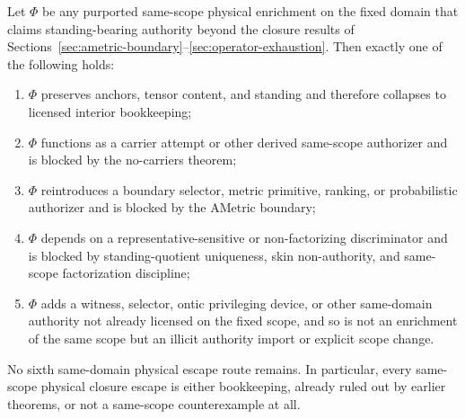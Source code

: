 \begin{theorem}
\label{thm:physical-closure-escape-exhaustion}
Let $\Phi$ be any purported same-scope physical enrichment on the fixed domain that claims standing-bearing authority beyond the closure results of Sections~\ref{sec:ametric-boundary}--\ref{sec:operator-exhaustion}. Then exactly one of the following holds:
\begin{enumerate}
  \item $\Phi$ preserves anchors, tensor content, and standing and therefore collapses to licensed interior bookkeeping;
  \item $\Phi$ functions as a carrier attempt or other derived same-scope authorizer and is blocked by the no-carriers theorem;
  \item $\Phi$ reintroduces a boundary selector, metric primitive, ranking, or probabilistic authorizer and is blocked by the AMetric boundary;
  \item $\Phi$ depends on a representative-sensitive or non-factorizing discriminator and is blocked by standing-quotient uniqueness, skin non-authority, and same-scope factorization discipline;
  \item $\Phi$ adds a witness, selector, ontic privileging device, or other same-domain authority not already licensed on the fixed scope, and so is not an enrichment of the same scope but an illicit authority import or explicit scope change.
\end{enumerate}
No sixth same-domain physical escape route remains. In particular, every same-scope physical closure escape is either bookkeeping, already ruled out by earlier theorems, or not a same-scope counterexample at all.
\end{theorem}

